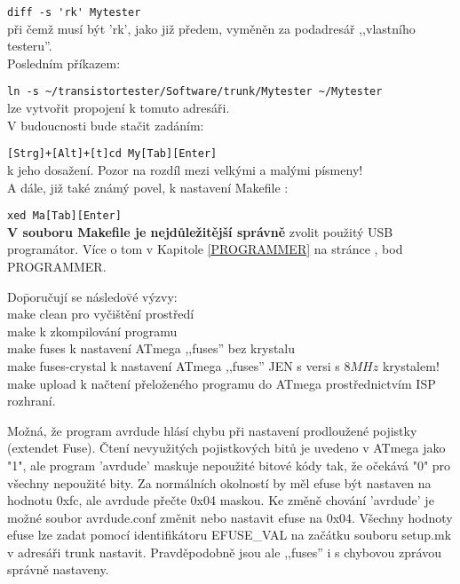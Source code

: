 \verb"diff -s 'rk' Mytester"\\
při čemž musí být 'rk', jako již předem, vyměněn za podadresář ,,vlastního testeru''.\\
Posledním příkazem:

\verb"ln -s ~/transistortester/Software/trunk/Mytester ~/Mytester"\\
lze vytvořit propojení k tomuto adresáři.\\
V budoucnosti bude stačit zadáním:

\verb"[Strg]+[Alt]+[t]cd My[Tab][Enter]"\\
k jeho dosažení. Pozor na rozdíl mezi velkými a malými písmeny!\\   
A dále, již také známý povel, k nastavení Makefile :

\verb"xed Ma[Tab][Enter]"\\
\textbf {V souboru Makefile je nejdůležitější správně} zvolit použitý USB programátor.
Více o tom v Kapitole \ref{PROGRAMMER} na stránce \pageref{PROGRAMMER}, bod PROGRAMMER.

\begin{tabbing}
Do\=poručují se následo\=vé výzvy:\\
\> make clean \> pro vyčištění prostředí\\
\> make       \> k zkompilování programu\\
\> make fuses \> k nastavení  ATmega ,,fuses'' bez krystalu\\
\> make fuses-crystal \> k nastavení  ATmega ,,fuses'' JEN s versi s \(8MHz\) krystalem!\\
\> make upload \>k načtení přeloženého programu do ATmega prostřednictvím ISP rozhraní.
\end{tabbing}\vspace{-0,3 cm}

Možná, že program avrdude hlásí chybu při nastavení prodloužené pojistky (extendet Fuse).
Čtení nevyužitých pojistkových bitů je uvedeno v ATmega jako "1", ale
program 'avrdude' maskuje nepoužité bitové kódy tak, že očekává "0" pro všechny nepoužité bity.
Za normálních okolností by měl efuse být nastaven na hodnotu 0xfc, ale avrdude přečte 0x04 maskou.
Ke změně chování 'avrdude' je možné soubor avrdude.conf změnit nebo nastavit efuse na 0x04.
Všechny hodnoty efuse lze zadat pomocí identifikátoru EFUSE\_VAL na začátku souboru setup.mk v adresáři
trunk nastavit. Pravděpodobně jsou ale ,,fuses'' i s chybovou zprávou správně nastaveny.

\newpage
